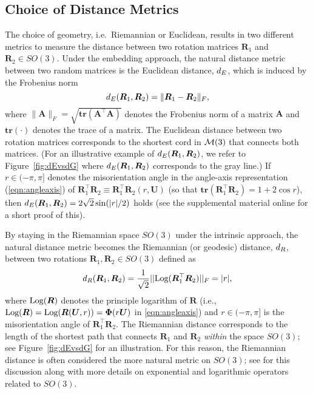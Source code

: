 \subsection{Choice of Distance Metrics}\label{subsec:metrics}

The choice of geometry, i.e.~Riemannian or Euclidean, results in two different metrics to measure the distance
between two rotation matrices $\bm{R}_1$ and $\bm{R}_2 \in SO(3)$. Under the embedding approach, the natural distance
metric between two random matrices is the Euclidean distance, ${d_E} $, which is induced by the Frobenius norm
\begin{equation}
\label{d_E}
{d_E} (\bm{R}_1,\bm{R}_2)=\|\bm{R}_1-\bm{R}_2\|_F, 
\end{equation}
where $\|\bm{A}\|_F = \sqrt{\mathbf{tr}({\bm A^\top \bm A})}$ denotes the Frobenius norm of a matrix $\bm A$ and $\mathbf{tr}(\cdot)$ denotes the trace of a matrix.  The Euclidean distance between two rotation matrices corresponds to the shortest cord in $\mathcal{M}(3)$  that connects both matrices. (For an illustrative example of ${d_E} (\bm{R}_1,\bm{R}_2)$, we refer to Figure~\ref{fig:dEvsdG} where ${d_E} (\bm{R}_1,\bm{R}_2)$ corresponds to the gray line.)  If $r\in(-\pi,\pi]$ denotes the misorientation angle in the angle-axis representation (\ref{eqn:angleaxis}) of $\bm{R}_1^\top \bm{R}_2 \equiv \bm{R}_1^\top \bm{R}_2(r,\bm{U})$ (so that $\mathbf{tr}(\bm{R}_1^\top \bm{R}_2) =1 +2 \cos r$), then ${d_E} (\bm{R}_1,\bm{R}_2) = 2\sqrt{2}\sin(|r|/2)$ holds (see the supplemental material online for a short proof of this).

By staying in the Riemannian space $SO(3)$ under the intrinsic approach, the natural distance metric becomes the Riemannian (or geodesic) distance, ${d_R} $, between two rotations $\bm{R}_1,\bm{R}_2\in SO(3)$ defined as
\begin{equation}
\label{d_R}
{d_R} (\bm{R}_1,\bm{R}_2)=  \frac{1}{\sqrt{2}}||
\text{Log}(\bm{R}_1^\top\bm{R}_2)||_F = |r|,
\end{equation}
where $\text{Log}(\bm{R})$ denotes the principle logarithm of $\bm{R}$ (i.e., $\text{Log}(\bm{R}) = \text{Log}(\bm{R}(\bm U,r))= \bm \Phi(r\bm U)$ in \eqref{eqn:angleaxis}) and $r\in(-\pi,\pi]$   is the misorientation angle of $\bm{R}_1^\top \bm{R}_2$. 
The Riemannian distance corresponds to the length of the shortest path that connects $\bm{R}_1$ and $\bm{R}_2$ {\it within} the space $SO(3)$; see Figure~\ref{fig:dEvsdG} for an illustration. For this reason, the Riemannian distance is often considered the more natural metric on $SO(3)$; see \cite{moakher02} for this discussion along with more details on exponential and logarithmic operators related to $SO(3)$.    
 
